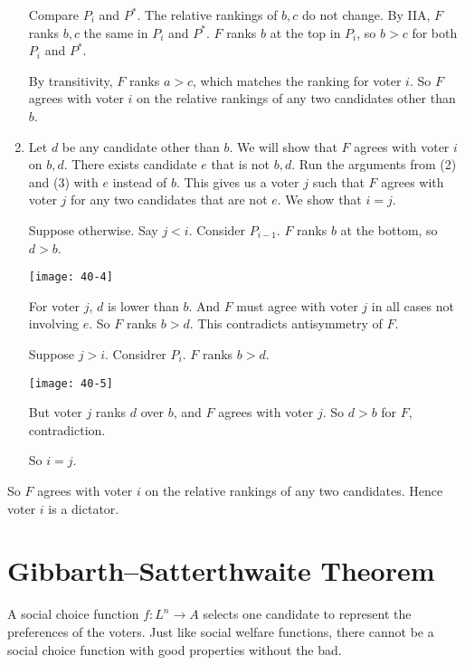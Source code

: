 \documentclass[12pt,letterpaper]{report}
\begin{document}
\begin{thmproof}
\begin{enumerate}
    Compare $P_i$ and $P^*$.
    The relative rankings of $b, c$ do not change.
    By IIA, $F$ ranks $b, c$ the same in $P_i$ and $P^*$.
    $F$ ranks $b$ at the top in $P_i$, so $b > c$ for both $P_i$ and $P^*$.

    By transitivity, $F$ ranks $a > c$, which matches the ranking for voter $i$.
    So $F$ agrees with voter $i$ on the relative rankings of any two candidates other than $b$.

    \item
    Let $d$ be any candidate other than $b$.
    We will show that $F$ agrees with voter $i$ on $b, d$.
    There exists candidate $e$ that is not $b, d$.
    Run the arguments from (2) and (3) with $e$ instead of $b$.
    This gives us a voter $j$ such that $F$ agrees with voter $j$ for any two candidates that are
    not $e$.
    We show that $i = j$.

    Suppose otherwise.
    Say $j < i$.
    Consider $P_{i - 1}$.
    $F$ ranks $b$ at the bottom, so $d > b$.
    \begin{center}
      \texttt{[image: 40-4]}
    \end{center}
    For voter $j$, $d$ is lower than $b$.
    And $F$ must agree with voter $j$ in all cases not involving $e$.
    So $F$ ranks $b > d$.
    This contradicts antisymmetry of $F$.

    Suppose $j > i$.
    Considrer $P_i$.
    $F$ ranks $b > d$.
    \begin{center}
      \texttt{[image: 40-5]}
    \end{center}
    But voter $j$ ranks $d$ over $b$, and $F$ agrees with voter $j$.
    So $d > b$ for $F$, contradiction.

    So $i = j$.
  \end{enumerate}

  So $F$ agrees with voter $i$ on the relative rankings of any two candidates.
  Hence voter $i$ is a dictator.
\end{thmproof}

\section{Gibbarth--Satterthwaite Theorem}

A social choice function $f \colon L^n \to A$ selects one candidate to represent the preferences of
the voters.
Just like social welfare functions, there cannot be a social choice function with good properties
without the bad.
\end{document}
